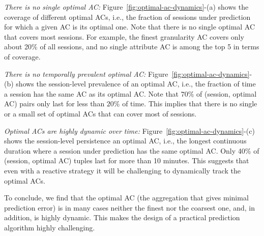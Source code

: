  
\begin{packeditemize}
	\item {\it There is no single optimal AC:} Figure~\ref{fig:optimal-ac-dynamics}-(a) shows the coverage of different optimal ACs, i.e., the fraction of sessions under prediction for which a given AC is its optimal one. Note that there is no single optimal AC that covers most sessions. For example, the finest granularity AC covers only about 20\% of all sessions, and no single attribute AC is among the top 5 in terms of coverage. 
	\item {\it There is no temporally prevalent optimal AC:} Figure~\ref{fig:optimal-ac-dynamics}-(b) shows the session-level prevalence of an optimal AC, i.e., the fraction of time a session has the same AC as its optimal AC. Note that $70\%$ of (session, optimal AC) pairs only last for less than $20\%$ of time. This implies that there is no single or a small set of optimal ACs that can cover most of sessions.
	\item {\it Optimal ACs are highly dynamic over time:} Figure~\ref{fig:optimal-ac-dynamics}-(c) shows the session-level persistence an optimal AC, i.e., the longest continuous duration where a session under prediction has the same optimal AC. Only 40\% of (session, optimal AC) tuples last for more than 10 minutes. This suggests that even with a reactive strategy it will be challenging to dynamically track the optimal ACs.
\end{packeditemize}

To conclude, we find that the optimal AC (the aggregation that gives minimal prediction error) is in many cases neither the finest nor the coarsest one, and, in addition, is highly dynamic. This makes the design of a practical prediction algorithm highly challenging.


